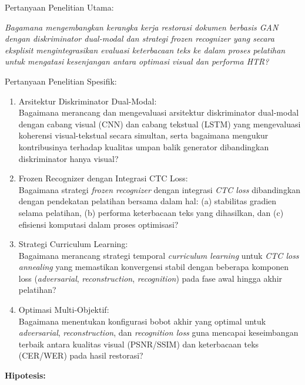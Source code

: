 \documentclass[12pt,a4paper]{article}
\begin{document}
\vspace{0.5em}
Pertanyaan Penelitian Utama:

\textit{Bagamana mengembangkan kerangka kerja restorasi dokumen berbasis GAN dengan diskriminator dual-modal dan strategi \textit{frozen recognizer} yang secara eksplisit mengintegrasikan evaluasi keterbacaan teks ke dalam proses pelatihan untuk mengatasi kesenjangan antara optimasi visual dan performa HTR?}

\vspace{0.8em}
Pertanyaan Penelitian Spesifik:

\begin{enumerate}[label=\arabic*., leftmargin=0.5cm]
    \item Arsitektur Diskriminator Dual-Modal: \\
    Bagaimana merancang dan mengevaluasi arsitektur diskriminator dual-modal dengan cabang visual (CNN) dan cabang tekstual (LSTM) yang mengevaluasi koherensi visual-tekstual secara simultan, serta bagaimana mengukur kontribusinya terhadap kualitas umpan balik generator dibandingkan diskriminator hanya visual?

    \item Frozen Recognizer dengan Integrasi CTC Loss: \\
    Bagaimana strategi \textit{frozen recognizer} dengan integrasi \textit{CTC loss} dibandingkan dengan pendekatan pelatihan bersama dalam hal: (a) stabilitas gradien selama pelatihan, (b) performa keterbacaan teks yang dihasilkan, dan (c) efisiensi komputasi dalam proses optimisasi?

    \item Strategi Curriculum Learning: \\
    Bagaimana merancang strategi temporal \textit{curriculum learning} untuk \textit{CTC loss annealing} yang memastikan konvergensi stabil dengan beberapa komponen loss (\textit{adversarial}, \textit{reconstruction}, \textit{recognition}) pada fase awal hingga akhir pelatihan?

    \item Optimasi Multi-Objektif: \\
    Bagaimana menentukan konfigurasi bobot akhir yang optimal untuk \textit{adversarial}, \textit{reconstruction}, dan \textit{recognition loss} guna mencapai keseimbangan terbaik antara kualitas visual (PSNR/SSIM) dan keterbacaan teks (CER/WER) pada hasil restorasi?
\end{enumerate}

\vspace{0.5ex}
\noindent\textbf{Hipotesis:}
\end{document}

